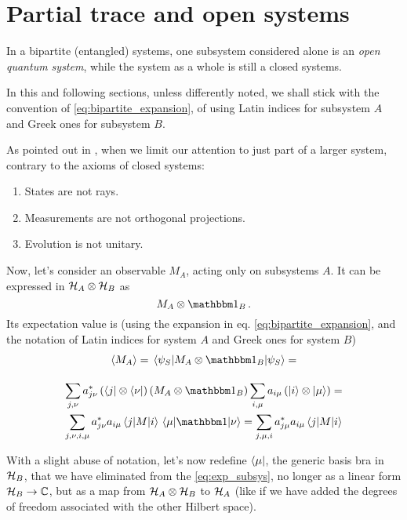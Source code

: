 \section{Partial trace and open systems}
\label{sec:p_tr}

In a bipartite (entangled) systems, one subsystem considered alone is an
\emph{open quantum system},
while the system as a whole is still a closed systems.

In this and following sections, unless differently noted,
we shall stick with the convention of \eqref{eq:bipartite_expansion},
of using
Latin indices for subsystem $A$ and Greek ones for subsystem $B$.

As pointed out in
\cite[sec.2.3.1]{PreskillNotes}, when we limit our attention to
just part of a larger system, contrary to the axioms of closed systems:
\begin{enumerate}
  \item States are not rays.
  \item Measurements are not orthogonal projections.
  \item Evolution is not unitary.
\end{enumerate}

Now, let's consider an observable $M_A$, acting only on subsystems $A$.
It can be expressed in $\mathcal{H}_A \otimes \mathcal{H}_B$ as
\[
  M_A \otimes \idop_B\, .
\]
Its expectation value is
(using the expansion in eq. \eqref{eq:bipartite_expansion},
and the notation of Latin indices for system $A$ and Greek ones for system $B$)
\begin{multline}\label{eq:exp_subsys}
  \expval{M_A} = \matrixel{\psi_S}{M_A\otimes\idop_B}{\psi_S} = \\[1em]
  \sum_{j,\nu}a^{*}_{j\nu}\left(\bra{j}\otimes\bra{\nu}\right)\left(M_A\otimes\idop_B\right)\sum_{i,\mu}a_{i\mu}\left(\ket{i}\otimes\ket{\mu}\right) = \\
  \sum_{j,\nu,i,\mu}a^{*}_{j\nu}a_{i\mu}\matrixel{j}{M}{i}\matrixel{\mu}{\idop}{\nu} =
  \sum_{j,\mu,i}a^{*}_{j\mu}a_{i\mu}\matrixel{j}{M}{i}
\end{multline}






With a slight abuse of notation,
let's now redefine
$\bra{\mu}$,
the generic basis bra in $\mathcal{H}_B$,
that we have eliminated from the \eqref{eq:exp_subsys}, 
no longer as a linear form $\mathcal{H}_B \rightarrow \mathbb{C}$,
but as a map from $\mathcal{H}_A\otimes\mathcal{H}_B$ to $\mathcal{H}_A$
(like if we have added the degrees of freedom associated
with the other Hilbert space).

